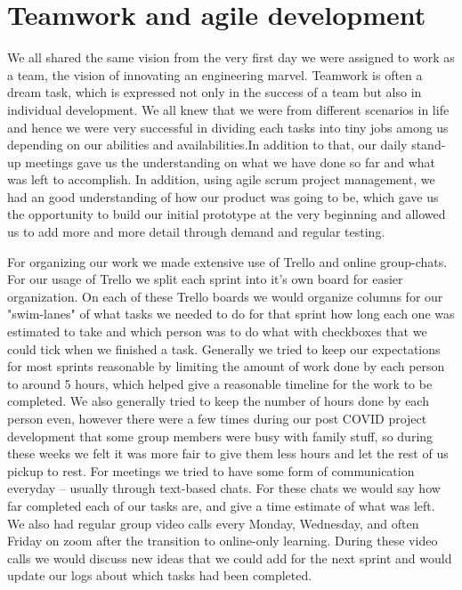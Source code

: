 \documentclass[11pt]{article}
\begin{document}
\section{Teamwork and agile development}
\label{sec:org9ec371a}

We all shared the same vision from the very first day we were assigned
to work as a team, the vision of innovating an engineering
marvel. Teamwork is often a dream task, which is expressed not only in
the success of a team but also in individual development. We all knew
that we were from different scenarios in life and hence we were very
successful in dividing each tasks into tiny jobs among us depending on
our abilities and availabilities.In addition to that, our daily
stand-up meetings gave us the understanding on what we have done so
far and what was left to accomplish. In addition, using agile scrum
project management, we had an good understanding of how our product
was going to be, which gave us the opportunity to build our initial
prototype at the very beginning and allowed us to add more and more
detail through demand and regular testing.

For organizing our work we made extensive use of Trello and online
group-chats. For our usage of Trello we split each sprint into it's
own board for easier organization. On each of these Trello boards we
would organize columns for our "swim-lanes" of what tasks we needed to
do for that sprint how long each one was estimated to take and which
person was to do what with checkboxes that we could tick when we
finished a task. Generally we tried to keep our expectations for most
sprints reasonable by limiting the amount of work done by each person
to around 5 hours, which helped give a reasonable timeline for the
work to be completed. We also generally tried to keep the number of
hours done by each person even, however there were a few times during
our post COVID project development that some group members were busy
with family stuff, so during these weeks we felt it was more fair to
give them less hours and let the rest of us pickup to rest. For
meetings we tried to have some form of communication everyday --
usually through text-based chats. For these chats we would say how far
completed each of our tasks are, and give a time estimate of what was
left. We also had regular group video calls every Monday, Wednesday,
and often Friday on zoom after the transition to online-only
learning. During these video calls we would discuss new ideas that we
could add for the next sprint and would update our logs about which
tasks had been completed.
\end{document}
